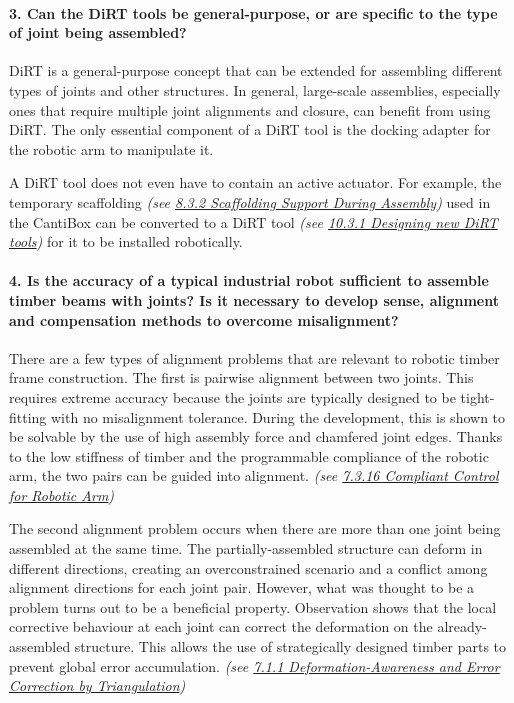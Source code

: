 \paragraph{3. Can the DiRT tools be general-purpose, or are specific to the type of joint being assembled?}

DiRT is a general-purpose concept that can be extended for assembling different types of joints and other structures. In general, large-scale assemblies, especially ones that require multiple joint alignments and closure, can benefit from using DiRT. The only essential component of a DiRT tool is the docking adapter for the robotic arm to manipulate it. 

A DiRT tool does not even have to contain an active actuator. For example, the temporary scaffolding \textit{(see \ul{8.3.2 Scaffolding Support During Assembly})} used in the CantiBox can be converted to a DiRT tool \textit{(see \ul{10.3.1 Designing new DiRT tools}) }for it to be installed robotically.

\paragraph{4. Is the accuracy of a typical industrial robot sufficient to assemble timber beams with joints? Is it necessary to develop sense, alignment and compensation methods to overcome misalignment?}

There are a few types of alignment problems that are relevant to robotic timber frame construction. The first is pairwise alignment between two joints. This requires extreme accuracy because the joints are typically designed to be tight-fitting with no misalignment tolerance. During the development, this is shown to be solvable by the use of high assembly force and chamfered joint edges. Thanks to the low stiffness of timber and the programmable compliance of the robotic arm, the two pairs can be guided into alignment. \textit{(see \ul{7.3.16 Compliant Control for Robotic Arm})}

The second alignment problem occurs when there are more than one joint being assembled at the same time. The partially-assembled structure can deform in different directions, creating an overconstrained scenario and a conflict among alignment directions for each joint pair. However, what was thought to be a problem turns out to be a beneficial property. Observation shows that the local corrective behaviour at each joint can correct the deformation on the already-assembled structure. This allows the use of strategically designed timber parts to prevent global error accumulation. \textit{(see \ul{7.1.1 Deformation-Awareness and Error Correction by Triangulation})}

